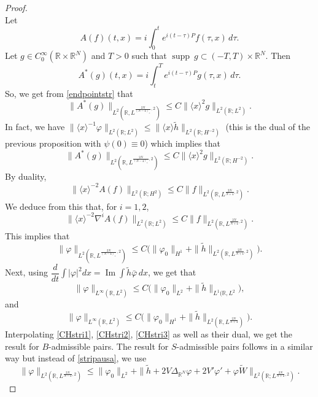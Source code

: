 \documentclass[10pt,a4paper]{amsart}
\DeclareMathOperator{\im}{Im}
\DeclareMathOperator{\supp}{supp}
\newcommand{\R}{\mathbb{R}}
\begin{document}
\begin{proof}
\begin{equation}
\end{equation}
Let $$A(f)(t,x)=i\int_0^t e^{i(t-\tau)P} f(\tau,x)\, d\tau.$$
Let $g\in C_0^\infty (\R \times \R^N)$ and  $T>0$ such that $\supp\ g \subset (-T,T) \times \R^N$. Then
$$A^\ast (g)(t,x)=i\int_t^T e^{i(t-\tau)P}g(\tau ,x)\, d\tau .$$
So, we get from \eqref{endpointstr} that
$$\|A^\ast (g)\|_{L^2 (\R, L^{\frac{2N}{(N-4)_+},2 })} \leq C \|\langle x\rangle^2  g\|_{L^2 (\R ; L^2)}.$$
In fact, we have $ \|\langle x\rangle ^{-1} \varphi\|_{L^2 (\R; L^2)} \leq  \|\langle x\rangle  \tilde{h}\|_{L^2 (\R ; H^{-2})} $ (this is the dual of the previous proposition with $\psi(0)\equiv 0$) which implies that
$$\|A^\ast (g)\|_{L^2 (\R, L^{\frac{2N}{(N-4)_+},2 })} \leq C \|\langle x\rangle^2  g\|_{L^2 (\R; H^{-2})}.$$
By duality,
$$\|\langle x\rangle ^{-2}A(f) \|_{L^2 (\R; H^2)} \leq C \|f\|_{L^2 (\R , L^{\frac{2N}{N+4},2 })}. $$
We deduce from this that, for $i=1,2$, 
$$\|\langle x\rangle ^{-2} \nabla^{i} A(f) \|_{L^2 (\R; L^2)} \leq C \|f\|_{L^2 (\R , L^{\frac{2N}{N+4},2 })}. $$
This implies that
\begin{equation}
\label{CHstri1}
\|\varphi\|_{L^2 (\R , L^{\frac{2N}{(N-4)_+},2 })} \leq C\big( \|\varphi_0\|_{H^1} +   \|\tilde{h}\|_{L^2 (\R , L^{\frac{2N}{N+4},2 })}\big).
\end{equation}
Next, using $\dfrac{d}{dt}\int |\varphi|^2 dx = \im \int \tilde{h} \bar{\varphi}\, dx$, we get that
\begin{equation}
\label{CHstri2}
\|\varphi\|_{L^\infty (\R ,L^2)} \leq  C\big( \|\varphi_0\|_{L^2} +   \|\tilde{h}\|_{L^1 (\R, L^{2}}\big), 
\end{equation}
and
\begin{equation}
\label{CHstri3}
\|\varphi\|_{L^\infty (\R ,L^2)} \leq  C\big( \|\varphi_0\|_{H^1} +    \|\tilde{h}\|_{L^2 (\R, L^{\frac{2N}{N+4} })} \big).
\end{equation}
Interpolating \eqref{CHstri1}, \eqref{CHstri2}, \eqref{CHstri3} as well as their dual, we get the result for $B$-admissible pairs. The result for $S$-admissible pairs follows in a similar way but instead of \eqref{stripausa}, we use 
$$\|\varphi\|_{L^2 (\R, L^{\frac{2N}{N-2},2 })} \leq \|\varphi_0\|_{L^2} + \| \tilde{h} + 2V\Delta_{\R^N} \varphi +2V' \varphi ' +\varphi \tilde{W}\|_{L^2 (\R; L^{\frac{2N}{N+2} ,2})}. $$

\end{proof}
\end{document}
